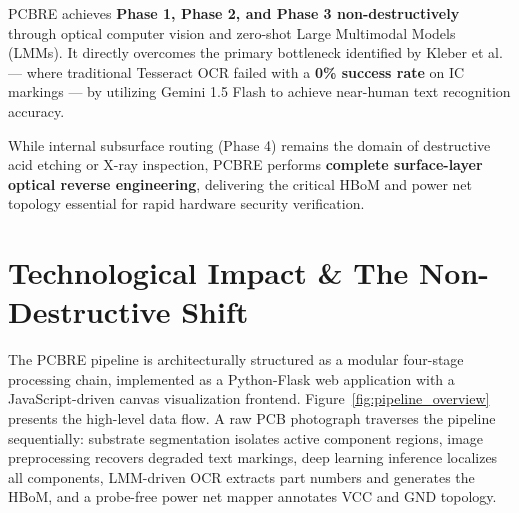 \documentclass[12pt,a4paper]{report}
\begin{document}
PCBRE achieves \textbf{Phase 1, Phase 2, and Phase 3 non-destructively} through optical computer vision and zero-shot Large Multimodal Models (LMMs). It directly overcomes the primary bottleneck identified by Kleber et al.~\cite{kleber2017woot} --- where traditional Tesseract OCR failed with a \textbf{0\% success rate} on IC markings --- by utilizing Gemini 1.5 Flash to achieve near-human text recognition accuracy. 

While internal subsurface routing (Phase 4) remains the domain of destructive acid etching or X-ray inspection, PCBRE performs \textbf{complete surface-layer optical reverse engineering}, delivering the critical HBoM and power net topology essential for rapid hardware security verification.

\section{Technological Impact \& The Non-Destructive Shift}
\label{sec:nd_shift}

The PCBRE pipeline is architecturally structured as a modular four-stage processing chain, implemented as a Python-Flask web application with a JavaScript-driven canvas visualization frontend. Figure~\ref{fig:pipeline_overview} presents the high-level data flow. A raw PCB photograph traverses the pipeline sequentially: substrate segmentation isolates active component regions, image preprocessing recovers degraded text markings, deep learning inference localizes all components, LMM-driven OCR extracts part numbers and generates the HBoM, and a probe-free power net mapper annotates VCC and GND topology.
\end{document}
